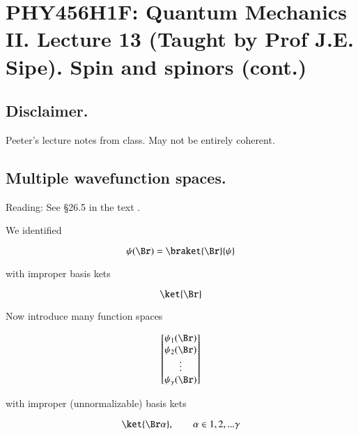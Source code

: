 %
%

\chapter{PHY456H1F: Quantum Mechanics II.  Lecture 13 (Taught by Prof J.E. Sipe).  Spin and spinors (cont.)}
\label{chap:qmTwoL13}
{}
\date{Oct 24, 2011}

\beginArtWithToc

\section{Disclaimer.}

Peeter's lecture notes from class.  May not be entirely coherent.

\section{Multiple wavefunction spaces.}

Reading: See \S 26.5 in the text \cite{desai2009quantum}.

We identified 

\begin{equation}\label{eqn:qmTwoL13:10}
\psi(\Br) = \braket{ \Br}{\psi}
\end{equation}

with improper basis kets

\begin{equation}\label{eqn:qmTwoL13:30}
\ket{\Br}
\end{equation}

Now introduce many function spaces

\begin{equation}\label{eqn:qmTwoL13:50}
\begin{bmatrix}
\psi_1(\Br) \\
\psi_2(\Br) \\
\vdots \\
\psi_\gamma(\Br)
\end{bmatrix}
\end{equation}

with improper (unnormalizable) basis kets

\begin{equation}\label{eqn:qmTwoL13:70}
\ket{\Br \alpha}, \qquad \alpha \in 1, 2, ... \gamma
\end{equation}

